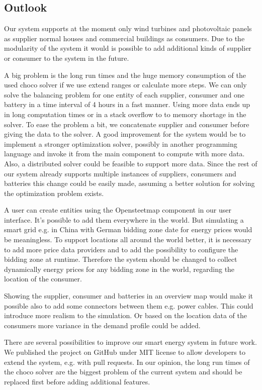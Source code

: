 \subsection{Outlook}
Our system supports at the moment only wind turbines and photovoltaic panels as supplier normal houses and commercial buildings as consumers.
Due to the modularity of the system it would is possible to add additional kinds of supplier or consumer to the system in the future.

A big problem is the long run times and the huge memory consumption of the used choco solver if we use extend ranges or calculate more steps.
We can only solve the balancing problem for one entity of each supplier, consumer and one battery in a time interval of 4 hours in a fast manner.
Using more data ends up in long computation times or in a stack overflow to to memory shortage in the solver.
To ease the problem a bit, we concatenate supplier and consumer before giving the data to the solver.
A good improvement for the system would be to implement a stronger optimization solver, possibly in another programming language and invoke it from the main component to compute with more data. Also, a distributed solver could be feasible to support more data. 
Since the rest of our system already supports multiple instances of suppliers, consumers and batteries this change could be easily made, assuming a better solution for solving the optimization problem exists.

A user can create entities using the Opensteetmap component in our user interface.
It's possible to add them everywhere in the world.
But simulating a smart grid e.g. in China with German bidding zone date for energy prices would be meaningless.
To support locations all around the world better, it is necessary to add more price data providers and to add the possibility to configure the bidding zone at runtime.
Therefore the system should be changed to collect dynamically energy prices for any bidding zone in the world, regarding the location of the consumer.

Showing the supplier, consumer and batteries in an overview map would make it possible also to add some connectors between them e.g. power cables. This could introduce more realism to the simulation. Or based on the location data of the consumers more variance in the demand profile could be added.

There are several possibilities to improve our smart energy system in future work.
We published the project on GitHub under MIT license to allow developers to extend the system, e.g. with pull requests.
In our opinion, the long run times of the choco solver are the biggest problem of the current system and should be replaced first before adding additional features.